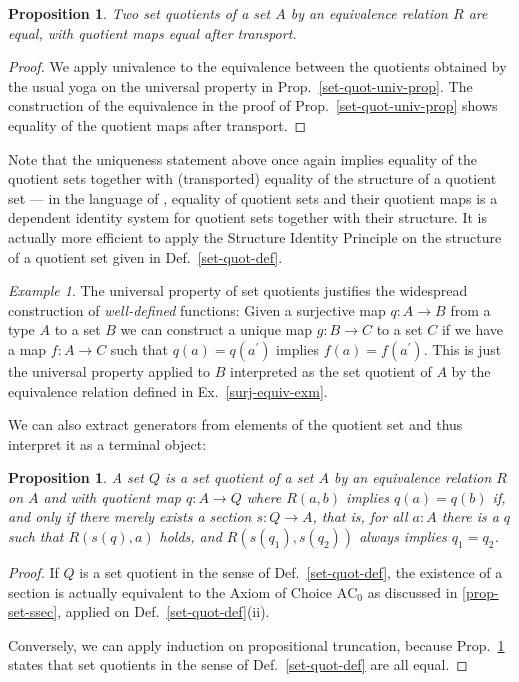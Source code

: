 \documentclass{amsart}
\theoremstyle{plain}
\numberwithin{equation}{section} %
\numberwithin{figure}{section} %
\theoremstyle{plain}
\theoremstyle{plain}
\theoremstyle{plain}
\theoremstyle{plain}
\theoremstyle{plain}
\newtheorem{prop}[thm]{Proposition} %
\theoremstyle{plain}
\theoremstyle{remark}
\theoremstyle{remark}
\theoremstyle{remark}
\newtheorem{exm}[thm]{Example}
\begin{document}
\begin{prop} \label{set-quot-eq-prop}  %
Two set quotients of a set $A$ by an equivalence relation $R$ are equal, with quotient maps equal after transport. 
\end{prop}
\begin{proof}
We apply univalence to the equivalence between the quotients obtained by the usual yoga on the universal property in Prop.~\ref{set-quot-univ-prop}. The construction of the equivalence in the proof of Prop.~\ref{set-quot-univ-prop}
shows equality of the quotient maps after transport.
\end{proof}

Note that the uniqueness statement above once again implies equality of the quotient sets together with (transported) equality of the structure of a quotient set  --- in the language of \cite[11.6]{Rij22}, equality of quotient sets and their quotient maps is a dependent identity system for quotient sets together with their structure. 
It is actually more efficient to apply the Structure Identity Principle on the structure of a quotient set given in Def.~\ref{set-quot-def}.

\begin{exm} \label{well-def-exm} %
The universal property of set quotients justifies the widespread construction of \textit{well-defined} functions: Given a surjective map $q: A \rightarrow B$ from a type $A$ to a set $B$ we can construct a unique map $g: B \rightarrow C$ to a set $C$ if we have a map $f: A \rightarrow C$ such that $q(a) = q(a^\prime)$ implies $f(a) = f(a^\prime)$. This is just the universal property applied to $B$ interpreted as the set quotient of $A$ by the equivalence relation defined in Ex.~\ref{surj-equiv-exm}.
\end{exm}

We can also extract generators from elements of the quotient set and thus interpret it as a terminal object:
\begin{prop}  \label{sec-quot-char-prop}
A set $Q$ is a set quotient of a set $A$ by an equivalence relation $R$ on $A$ and with quotient map $q : A \rightarrow Q$ where $R(a, b)$ implies $q(a) = q(b)$ if, and only if there merely exists a section $s : Q \rightarrow A$, that is, for all $a : A$ there is a $q$ such that $R(s(q), a)$ holds, and $R(s(q_1), s(q_2))$ always implies $q_1 = q_2$. 
\end{prop}
\begin{proof}
If $Q$ is a set quotient in the sense of Def.~\ref{set-quot-def}, the existence of a section is actually equivalent to the Axiom of Choice $\mathrm{AC}_0$ as discussed in \ref{prop-set-ssec}, applied on Def.~\ref{set-quot-def}(ii). 

Conversely, we can apply induction on propositional truncation, because Prop.~\ref{set-quot-eq-prop} states that set quotients in the sense of Def.~\ref{set-quot-def} are all equal.
\end{proof}
\end{document}
